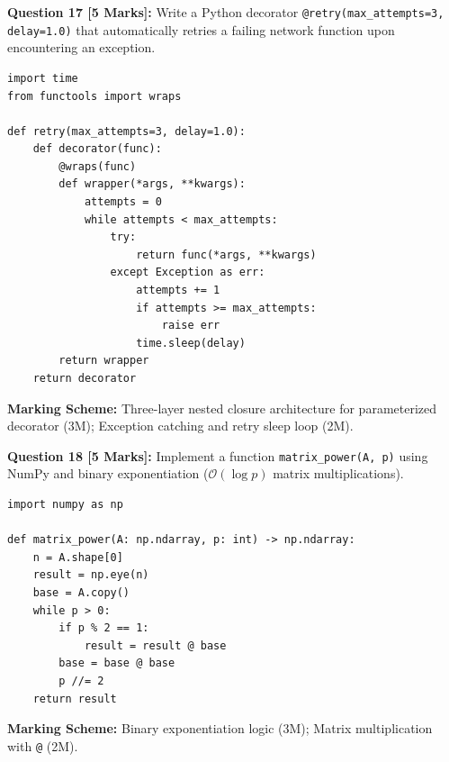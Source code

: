 \noindent\textbf{Question 17 [5 Marks]:} Write a Python decorator \texttt{@retry(max\_attempts=3, delay=1.0)} that automatically retries a failing network function upon encountering an exception.
\begin{solutionbox}
\begin{lstlisting}
import time
from functools import wraps

def retry(max_attempts=3, delay=1.0):
    def decorator(func):
        @wraps(func)
        def wrapper(*args, **kwargs):
            attempts = 0
            while attempts < max_attempts:
                try:
                    return func(*args, **kwargs)
                except Exception as err:
                    attempts += 1
                    if attempts >= max_attempts:
                        raise err
                    time.sleep(delay)
        return wrapper
    return decorator
\end{lstlisting}
\end{solutionbox}
\begin{markingrubric}
\textbf{Marking Scheme:} Three-layer nested closure architecture for parameterized decorator (3M); Exception catching and retry sleep loop (2M).
\end{markingrubric}

\noindent\textbf{Question 18 [5 Marks]:} Implement a function \texttt{matrix\_power(A, p)} using NumPy and binary exponentiation ($\mathcal{O}(\log p)$ matrix multiplications).
\begin{solutionbox}
\begin{lstlisting}
import numpy as np

def matrix_power(A: np.ndarray, p: int) -> np.ndarray:
    n = A.shape[0]
    result = np.eye(n)
    base = A.copy()
    while p > 0:
        if p % 2 == 1:
            result = result @ base
        base = base @ base
        p //= 2
    return result
\end{lstlisting}
\end{solutionbox}
\begin{markingrubric}
\textbf{Marking Scheme:} Binary exponentiation logic (3M); Matrix multiplication with \texttt{@} (2M).
\end{markingrubric}

